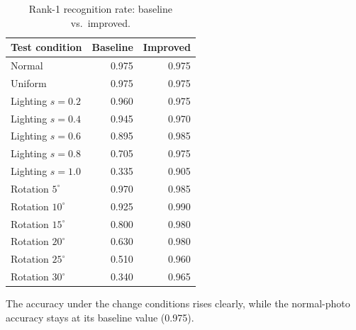 \documentclass[11pt]{article}
\begin{document}
\begin{table}[htbp]
  \centering
  \caption{Rank-1 recognition rate: baseline vs.\ improved.}
  \label{tab:improved}
  \begin{tabular}{lrr}
    \toprule
    Test condition & Baseline & Improved \\
    \midrule
    Normal        & 0.975 & 0.975 \\
    \midrule
    Uniform       & 0.975 & 0.975 \\
    \midrule
    Lighting $s = 0.2$ & 0.960 & 0.975 \\
    Lighting $s = 0.4$ & 0.945 & 0.970 \\
    Lighting $s = 0.6$ & 0.895 & 0.985 \\
    Lighting $s = 0.8$ & 0.705 & 0.975 \\
    Lighting $s = 1.0$ & 0.335 & 0.905 \\
    \midrule
    Rotation $5^\circ$  & 0.970 & 0.985 \\
    Rotation $10^\circ$ & 0.925 & 0.990 \\
    Rotation $15^\circ$ & 0.800 & 0.980 \\
    Rotation $20^\circ$ & 0.630 & 0.980 \\
    Rotation $25^\circ$ & 0.510 & 0.960 \\
    Rotation $30^\circ$ & 0.340 & 0.965 \\
    \bottomrule
  \end{tabular}
\end{table}

The accuracy under the change conditions rises clearly, while the normal-photo
accuracy stays at its baseline value (0.975).
\end{document}
